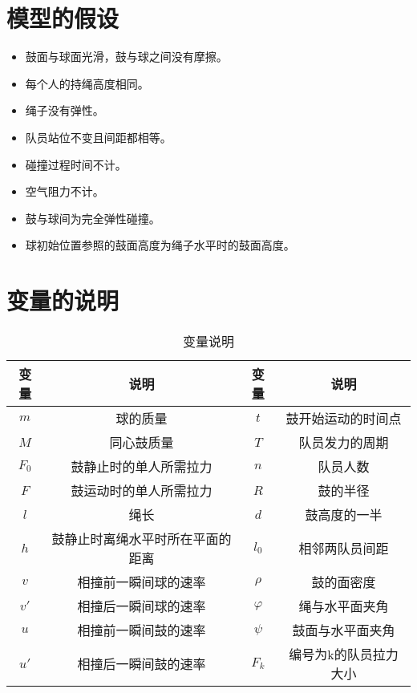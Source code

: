 \documentclass[withoutpreface,bwprint]{cumcmthesis} %
\begin{document}
\section{模型的假设}

\begin{itemize}
    \item 鼓面与球面光滑，鼓与球之间没有摩擦。
    \item 每个人的持绳高度相同。
    \item 绳子没有弹性。
	\item 队员站位不变且间距都相等。
	\item 碰撞过程时间不计。
	\item 空气阻力不计。
	\item 鼓与球间为完全弹性碰撞。
	\item 球初始位置参照的鼓面高度为绳子水平时的鼓面高度。
\end{itemize}



\section{变量的说明}

\begin{table}[!htbp]
    \caption{变量说明}\label{tab:001} \centering
    \begin{tabular}{cccc}
        \toprule[1.5pt]
        变量 & 说明 & 变量 &  说明 \\
        \midrule[1pt]
        $m$ & 球的质量 & $t$ & 鼓开始运动的时间点  \\
        $M$ & 同心鼓质量 & $T$ & 队员发力的周期 \\
        $F_0$ & 鼓静止时的单人所需拉力 & $n$ & 队员人数 \\
         $F$ & 鼓运动时的单人所需拉力 & $R$ & 鼓的半径 \\
         $l$ & 绳长 & $d$ & 鼓高度的一半 \\
         $h$  & 鼓静止时离绳水平时所在平面的距离 & $l_0$ & 相邻两队员间距 \\
          $v$ & 相撞前一瞬间球的速率 & $\rho$ & 鼓的面密度  \\
          $v'$ & 相撞后一瞬间球的速率 & $\varphi$ & 绳与水平面夹角  \\
         $u $& 相撞前一瞬间鼓的速率 & $\psi$ & 鼓面与水平面夹角 \\
         $u'$ & 相撞后一瞬间鼓的速率 & $F_k$ & 编号为k的队员拉力大小  \\

        \bottomrule[1.5pt]
    \end{tabular}
\end{table}
\end{document}
